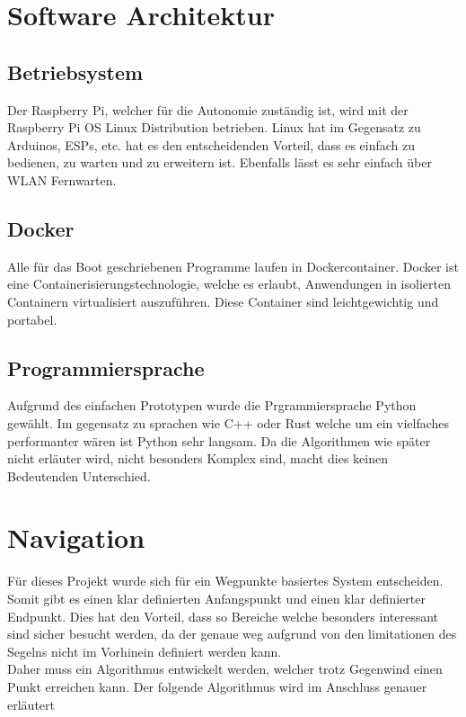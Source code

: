 \section{Software Architektur}
\subsection*{Betriebsystem}
Der Raspberry Pi, welcher für die Autonomie zuständig ist, wird mit der Raspberry Pi OS Linux Distribution betrieben. Linux hat im Gegensatz zu Arduinos, ESPs, etc. hat es den entscheidenden Vorteil, dass es einfach zu bedienen, zu warten und zu erweitern ist. Ebenfalls lässt es sehr einfach über WLAN Fernwarten. 

\subsection*{Docker}
Alle für das Boot geschriebenen Programme laufen in Dockercontainer. Docker ist eine Containerisierungstechnologie, welche es erlaubt, Anwendungen in isolierten Containern virtualisiert auszuführen. Diese Container sind leichtgewichtig und portabel.

\subsection*{Programmiersprache}
Aufgrund des einfachen Prototypen wurde die Prgrammiersprache Python gewählt. Im gegensatz zu sprachen wie C++ oder Rust welche um ein vielfaches performanter wären ist Python sehr langsam. Da die Algorithmen wie später nicht erläuter wird, nicht besonders Komplex sind, macht dies keinen Bedeutenden Unterschied. 


\section{Navigation}
Für dieses Projekt wurde sich für ein Wegpunkte basiertes System entscheiden. Somit gibt es einen klar definierten Anfangspunkt und einen klar definierter Endpunkt. Dies hat den Vorteil, dass so Bereiche welche besonders interessant sind sicher besucht werden, da der genaue weg aufgrund von den limitationen des Segelns nicht im Vorhinein definiert werden kann. \\
Daher muss ein Algorithmus entwickelt werden, welcher trotz Gegenwind einen Punkt erreichen kann. Der folgende Algorithmus wird im Anschluss genauer erläutert

